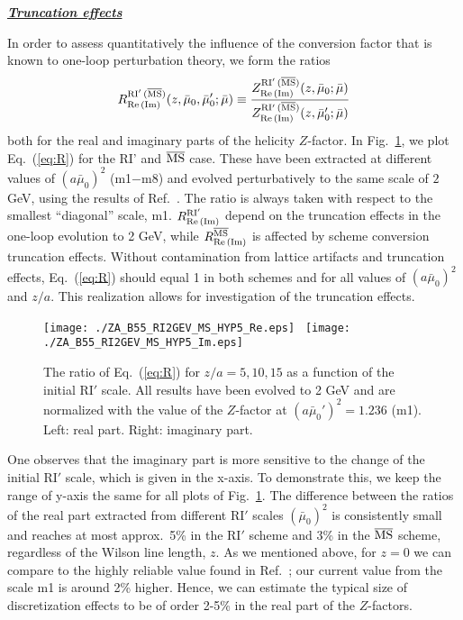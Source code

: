 \documentclass[12pt,tighten,nofootinbib,amssymb,floatfix]{article}
\newcommand{\MSb}{{\overline{\rm MS}}}
\newcommand{\be}{\begin{equation}}
\newcommand{\ee}{\end{equation}}
\begin{document}
\newpage
\centerline{\bf\underline{\textit{Truncation effects}}}
\vskip 0.25cm

In order to assess quantitatively the influence of the conversion factor that is known to one-loop perturbation theory, we form the ratios
\be
\label{eq:R}
R_{\rm Re\,(Im)}^{{\rm RI'}\,(\MSb)}(z, \bar\mu_0,\bar\mu_0';\bar\mu)\equiv 
\frac{Z_{\rm Re\,(Im)}^{{\rm RI'}\,(\MSb)}(z,\bar\mu_0;\bar\mu)}{Z_{\rm Re\,(Im)}^{{\rm RI'}\,(\MSb)}(z,\bar\mu_0';\bar\mu)}
\ee
both for the real and imaginary parts of the helicity $Z$-factor.  In Fig.~\ref{fig:RIvsMS}, we plot Eq.~(\ref{eq:R}) for the RI' and 
$\MSb$ case. These have been extracted at different values of $(a\bar\mu_0)^2$ (m1$-$m8) and evolved perturbatively to the same 
scale of $2$ GeV, using the results of Ref.~\cite{Constantinou:2017sej}. The ratio is always taken with respect to the 
smallest ``diagonal'' scale, m1. $R_{\rm Re\,(Im)}^{\rm RI'}$ depend on the truncation effects in the one-loop evolution to 2 GeV, while 
$R_{\rm Re\,(Im)}^\MSb$ is affected by scheme conversion truncation effects. Without contamination from lattice artifacts and 
truncation effects, Eq.~(\ref{eq:R}) should equal 1 in both schemes and for all values of $(a\bar\mu_0)^2$ and $z/a$. This realization 
allows for investigation of the truncation effects.

\bigskip
\begin{figure}[h]
\centering
\texttt{[image: ./ZA\_B55\_RI2GEV\_MS\_HYP5\_Re.eps]}\,\,\,
\texttt{[image: ./ZA\_B55\_RI2GEV\_MS\_HYP5\_Im.eps]}
\vspace*{-0.3cm}
\begin{minipage}{15cm}
\hspace*{3cm}
\caption{\small{The ratio of Eq.~(\ref{eq:R}) for $z/a{=}5,10,15$ as a function of the initial RI$'$ scale. 
All results have been evolved to 2 GeV and are normalized with the value of the $Z$-factor at 
$(a\bar\mu_0')^2{=}1.236$ (m1). Left: real part. Right: imaginary part. }}
\label{fig:RIvsMS} 
\end{minipage}
\end{figure}

One observes that the imaginary part is more sensitive to the change of the initial RI$'$ scale, which is given in the x-axis.
To demonstrate this, we keep the range of y-axis the same for all plots of Fig.~\ref{fig:RIvsMS}.
The difference between the ratios of the real part extracted from different RI$'$ scales $(\bar\mu_0)^2$ is consistently 
small and reaches at most approx.\ 5\% in the RI$'$ scheme and 3\% in the $\MSb$ scheme, regardless of the Wilson line 
length, $z$.  As we mentioned above, for $z{=}0$ we can compare to the highly reliable value found in Ref.~\cite{Alexandrou:2015sea}; 
our current value from the scale m1 is around 2\% higher. Hence, we can estimate the typical size of 
discretization effects to be of order 2-5\% in the real part of the $Z$-factors.
\end{document}

